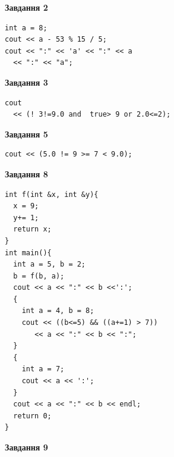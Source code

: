 \documentclass[12pt, ukrainian]{article}
\begin{document}
{\begin {large}
\begin{minipage}[t]{7.0cm}
\end{minipage}
\vline \hspace{1mm}
\begin{minipage}[t]{11.0cm}

\begin{center}
\textbf{Завдання 2}
\end{center}
\vspace{-8mm}

\begin{verbatim}
int a = 8;
cout << a - 53 % 15 / 5;
cout << ":" << 'a' << ":" << a 
  << ":" << "a";
\end{verbatim}



\begin{center}
\textbf{Завдання 3}
\end{center}
\vspace{-8mm}

\begin{verbatim}
cout 
  << (! 3!=9.0 and  true> 9 or 2.0<=2);
\end{verbatim}



\begin{center}
\textbf{Завдання 5}
\end{center}
\vspace{-8mm}

\begin{verbatim}
cout << (5.0 != 9 >= 7 < 9.0);
\end{verbatim}



\begin{center}
\textbf{Завдання 8}
\end{center}
\vspace{-8mm}

\begin{verbatim}
int f(int &x, int &y){
  x = 9;
  y+= 1;
  return x;
}
int main(){
  int a = 5, b = 2;
  b = f(b, a);
  cout << a << ":" << b <<':';
  {
    int a = 4, b = 8;
    cout << ((b<=5) && ((a+=1) > 7))
       << a << ":" << b << ":";
  }
  {
    int a = 7;
    cout << a << ':';
  }
  cout << a << ":" << b << endl;
  return 0;
}
\end{verbatim}

\end{minipage}


\begin{minipage}[t]{7.0cm}

\begin{center}
\textbf{Завдання 9}
\end{center}
\vspace{-8mm}


\end{minipage}
\end{large}}
\end{document}
